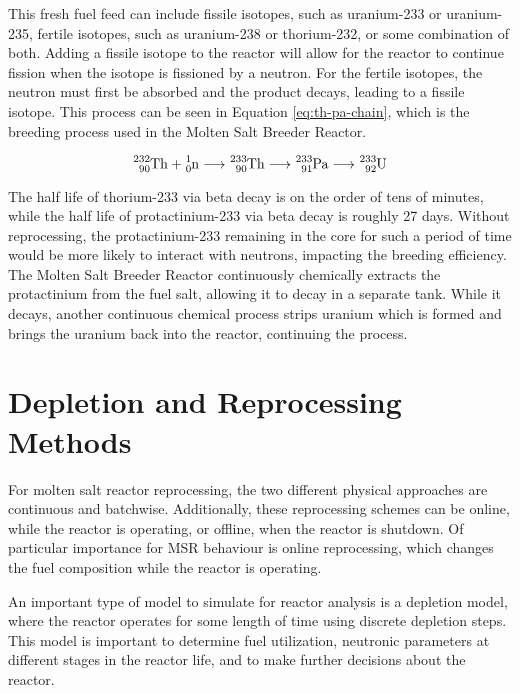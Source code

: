 This fresh fuel feed can include fissile isotopes, such as uranium-233 or uranium-235, fertile isotopes, such as uranium-238 or thorium-232, or some combination of both. Adding a fissile isotope to the reactor will allow for the reactor to continue fission when the isotope is fissioned by a neutron. For the fertile isotopes, the neutron must first be absorbed and the product decays, leading to a fissile isotope. This process can be seen in Equation \eqref{eq:th-pa-chain}, which is the breeding process used in the Molten Salt Breeder Reactor.

\begin{equation} \hfill
\ce{^{232}_{90}Th} + \ce{^{1}_{0}n} \longrightarrow \ce{^{233}_{90}Th} \longrightarrow \ce{^{233}_{91}Pa} \longrightarrow \ce{^{233}_{92}U}
\hfill\label{eq:th-pa-chain} \end{equation}

The half life of thorium-233 via beta decay is on the order of tens of minutes, while the half life of protactinium-233 via beta decay is roughly 27 days. Without reprocessing, the protactinium-233 remaining in the core for such a period of time would be more likely to interact with neutrons, impacting the breeding efficiency. The Molten Salt Breeder Reactor continuously chemically extracts the protactinium from the fuel salt, allowing it to decay in a separate tank. While it decays, another continuous chemical process strips uranium which is formed and brings the uranium back into the reactor, continuing the process.

\section{Depletion and Reprocessing Methods}

For molten salt reactor reprocessing, the two different physical approaches are continuous and batchwise. Additionally, these reprocessing schemes can be online, while the reactor is operating, or offline, when the reactor is shutdown. Of particular importance for MSR behaviour is online reprocessing, which changes the fuel composition while the reactor is operating.

An important type of model to simulate for reactor analysis is a depletion model, where the reactor operates for some length of time using discrete depletion steps. This model is important to determine fuel utilization, neutronic parameters at different stages in the reactor life, and to make further decisions about the reactor.

